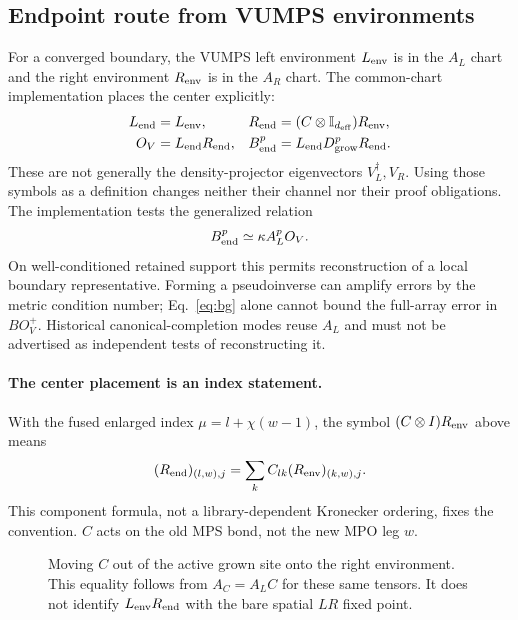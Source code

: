 \documentclass[11pt]{article}
\newcommand{\id}{\mathbb I}
\newcommand{\Dg}{D_{\mathrm{grow}}}
\begin{document}
\subsection{Endpoint route from VUMPS environments}
\label{sec:endmap}
For a converged boundary, the VUMPS left environment $L_{\rm env}$ is in the
$A_L$ chart and the right environment $R_{\rm env}$ is in the $A_R$ chart.
The common-chart implementation places the center explicitly:
\begin{align}
 L_{\rm end}&=L_{\rm env},&
 R_{\rm end}&=(C\otimes\id_{d_{\rm eff}})R_{\rm env},\\
 O_V&=L_{\rm end}R_{\rm end},&
 B_{\rm end}^p&=L_{\rm end}\Dg^pR_{\rm end}.
\end{align}
These are not generally the density-projector eigenvectors $V_L^\dagger,V_R$.
Using those symbols as a definition changes neither their channel nor their
proof obligations. The implementation tests the generalized relation
\begin{equation}\label{eq:bg}
 B_{\rm end}^p\simeq\kappa A_L^p O_V.
\end{equation}
On well-conditioned retained support this permits reconstruction of a local
boundary representative. Forming a pseudoinverse can amplify errors by the
metric condition number; Eq.~\eqref{eq:bg} alone cannot bound the full-array
error in $BO_V^+$. Historical canonical-completion modes reuse $A_L$ and must
not be advertised as independent tests of reconstructing it.

\ifdetailed
\paragraph{The center placement is an index statement.}
With the fused enlarged index $\mu=l+\chi(w-1)$, the symbol
$(C\otimes I)R_{\rm env}$ above means
\begin{equation}
 (R_{\rm end})_{(l,w),j}=\sum_k C_{lk}(R_{\rm env})_{(k,w),j}.
\end{equation}
This component formula, not a library-dependent Kronecker ordering, fixes
the convention. $C$ acts on the old MPS bond, not the new MPO leg $w$.

\begin{figure}[htbp]\centering
{}
\caption{Moving $C$ out of the active grown site onto the right environment.
This equality follows from $A_C=A_LC$ for these same tensors. It does not
identify $L_{\rm env}R_{\rm end}$ with the bare spatial $LR$ fixed point.}
\end{figure}
\end{document}
